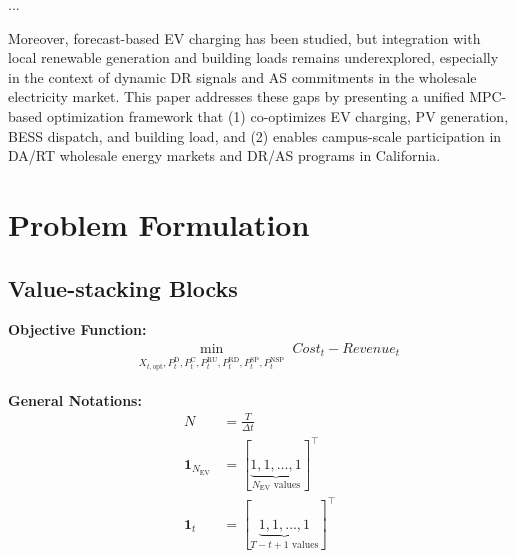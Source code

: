 \documentclass[conference]{IEEEtran}
\begin{document}
...



Moreover, forecast-based EV charging has been studied, but integration with local renewable generation and building loads remains underexplored, especially in the context of dynamic DR signals and AS commitments in the wholesale electricity market. This paper addresses these gaps by presenting a unified MPC-based optimization framework that (1) co-optimizes EV charging, PV generation, BESS dispatch, and building load, and (2) enables campus-scale participation in DA/RT wholesale energy markets and DR/AS programs in California.

\section{Problem Formulation}

\subsection{Value-stacking Blocks}

\textbf{Objective Function:}
\begin{align}
    &\min_{\substack{X_{t,\text{opt}}, P^{\text{D}}_{t}, P^{\text{C}}_{t}, P^{\text{RU}}_t, P^{\text{RD}}_t, P^{\text{SP}}_t, P^{{\text{NSP}}}_t}} Cost_t - Revenue_t \label{eq:obj}
\end{align}


\textbf{General Notations:}
\begin{align}
    N &= \frac{T}{\Delta{t}} \label{eq:N} \\
%    
    \mathbf{1}_{N_{\text{EV}}} &= \left[ \underbrace{1, 1, \dots, 1}_{N_{\text{EV}} \text{ values}} \right]^\top \label{eq:1nev}\\
%    
    \mathbf{1}_t &= \left[ \underbrace{1, 1, \dots, 1}_{T-t+1 \text{ values}} \right]^\top \label{eq:1t}
\end{align}
\end{document}
